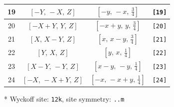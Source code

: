 \documentclass[fleqn,8pt]{jsarticle}
\begin{document}
\begin{longtable}{cccc}
19 & $\left[ - Y,\, - X,\, Z \right]$ & $\left[ - y,\, - x,\, \frac{3}{4} \right]$ & {\tt [19]} \\ \hline
20 & $\left[ - X + Y,\, Y,\, Z \right]$ & $\left[ - x + y,\, y,\, \frac{3}{4} \right]$ & {\tt [20]} \\ \hline
21 & $\left[ X,\, X - Y,\, Z \right]$ & $\left[ x,\, x - y,\, \frac{3}{4} \right]$ & {\tt [21]} \\ \hline
22 & $\left[ Y,\, X,\, Z \right]$ & $\left[ y,\, x,\, \frac{1}{4} \right]$ & {\tt [22]} \\ \hline
23 & $\left[ X - Y,\, - Y,\, Z \right]$ & $\left[ x - y,\, - y,\, \frac{1}{4} \right]$ & {\tt [23]} \\ \hline
24 & $\left[ - X,\, - X + Y,\, Z \right]$ & $\left[ - x,\, - x + y,\, \frac{1}{4} \right]$ & {\tt [24]} \\
\end{longtable}
* Wyckoff site: {\tt 12k}, site symmetry: {\tt ..m}
\renewcommand{\arraystretch}{1.2}
\end{document}
